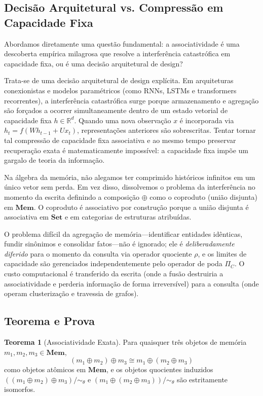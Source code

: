 \documentclass[11pt,a4paper]{article}
\theoremstyle{definition}
\newtheorem{teorema}{Teorema}[section]
\begin{document}
\subsection{Decis\~ao Arquitetural vs. Compress\~ao em Capacidade Fixa}

Abordamos diretamente uma quest\~ao fundamental: a associatividade \'e uma descoberta emp\'irica milagrosa que resolve a interfer\^encia catastr\'ofica em capacidade fixa, ou \'e uma decis\~ao arquitetural de design?

Trata-se de uma decis\~ao arquitetural de design expl\'icita.
Em arquiteturas conexionistas e modelos param\'etricos (como RNNs, LSTMs e transformers recorrentes), a interfer\^encia catastr\'ofica surge porque armazenamento e agrega\c{c}\~ao s\~ao for\c{c}ados a ocorrer simultaneamente dentro de um estado vetorial de capacidade fixa $h \in \mathbb{R}^d$. Quando uma nova observa\c{c}\~ao $x$ \'e incorporada via $h_t = f(W h_{t-1} + U x_t)$, representa\c{c}\~oes anteriores s\~ao sobrescritas. Tentar tornar tal compress\~ao de capacidade fixa associativa e ao mesmo tempo preservar recupera\c{c}\~ao exata \'e matematicamente imposs\'ivel: a capacidade fixa imp\~oe um gargalo de teoria da informa\c{c}\~ao.

Na \'algebra da mem\'oria, n\~ao alegamos ter comprimido hist\'oricos infinitos em um \'unico vetor sem perda. Em vez disso, dissolvemos o problema da interfer\^encia no momento da escrita definindo a composi\c{c}\~ao $\oplus$ como o coproduto (uni\~ao disjunta) em $\mathbf{Mem}$. O coproduto \'e associativo por constru\c{c}\~ao porque a uni\~ao disjunta \'e associativa em $\mathbf{Set}$ e em categorias de estruturas atribu\'idas.

O problema dif\'icil da agrega\c{c}\~ao de mem\'oria---identificar entidades id\^enticas, fundir sin\^onimos e consolidar fatos---n\~ao \'e ignorado; ele \'e \emph{deliberadamente diferido} para o momento da consulta via operador quociente $\rho$, e os limites de capacidade s\~ao gerenciados independentemente pelo operador de poda $\Pi_C$. O custo computacional \'e transferido da escrita (onde a fus\~ao destruiria a associatividade e perderia informa\c{c}\~ao de forma irrevers\'ivel) para a consulta (onde operam clusteriza\c{c}\~ao e travessia de grafos).

\subsection{Teorema e Prova}

\begin{teorema}[Associatividade Exata]
Para quaisquer tr\^es objetos de mem\'oria $m_1, m_2, m_3 \in \mathbf{Mem}$,
\[
(m_1 \oplus m_2) \oplus m_3 \cong m_1 \oplus (m_2 \oplus m_3)
\]
como objetos at\^omicos em $\mathbf{Mem}$, e os objetos quocientes induzidos $( (m_1 \oplus m_2) \oplus m_3 ) / \sim_\theta$ e $( m_1 \oplus (m_2 \oplus m_3) ) / \sim_\theta$ s\~ao estritamente isomorfos.
\end{teorema}
\end{document}
